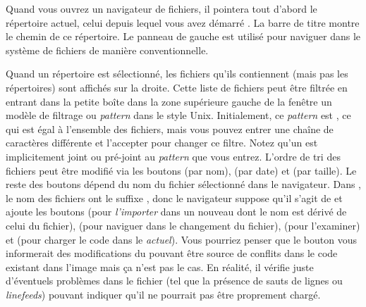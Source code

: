 \documentclass[a4paper,10pt,twoside]{book}
\begin{document}
Quand vous ouvrez un navigateur de fichiers, il pointera tout d'abord le répertoire
actuel, \ie celui depuis lequel vous avez démarré \pharo. La barre de titre
montre le chemin de ce répertoire.
Le panneau de gauche est utilisé pour naviguer dans le système de fichiers de manière
conventionnelle.

Quand un répertoire est sélectionné, les fichiers qu'ils contiennent (mais pas les répertoires) 
sont affichés sur la droite. Cette liste de fichiers peut être filtrée en entrant dans la petite boîte
dans la zone supérieure gauche de la fenêtre un modèle de filtrage ou 
\emph{pattern} dans le style Unix.
Initialement, ce \emph{pattern} est \ct{*}, ce qui est égal à l'ensemble des fichiers, mais vous 
pouvez entrer une chaîne de caractères différente et l'accepter pour changer ce filtre. 
Notez qu'un \ct{*} est implicitement joint ou pré-joint au \emph{pattern}
que vous entrez.
L'ordre de tri des fichiers peut être modifié via les boutons  (par nom), 
 (par date) et  (par taille).
Le reste des boutons dépend du nom du fichier sélectionné dans le navigateur.
Dans , le nom des fichiers ont le suffixe , donc le navigateur
suppose qu'il s'agit de \changeset et ajoute les boutons  (pour
\textit{l'importer} dans un nouveau \changeset dont le nom est dérivé
de celui du fichier),  (pour naviguer dans le changement du fichier),
 (pour l'examiner) et  (pour charger
le code dans le \changeset \emph{actuel}).
Vous pourriez penser que le bouton  vous informerait 
des modifications du \changeset pouvant être source de conflits dans le code existant
dans l'image mais ça n'est pas le cas.
En réalité, il vérifie juste d'éventuels problèmes dans le fichier (tel que
la présence de sauts de lignes ou \textit{linefeeds})
pouvant indiquer qu'il ne pourrait pas être proprement chargé.
\end{document}
